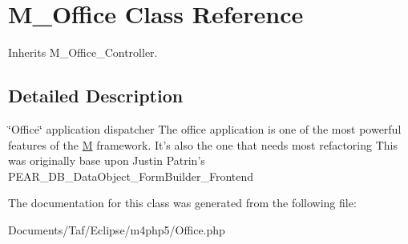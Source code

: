 \hypertarget{classM__Office}{
\section{M\_\-Office Class Reference}
\label{classM__Office}
}
Inherits M\_\-Office\_\-Controller.



\subsection{Detailed Description}
\char`\"{}Office\char`\"{} application dispatcher The office application is one of the most powerful features of the \hyperlink{namespaceM}{M} framework. It's also the one that needs most refactoring This was originally base upon Justin Patrin's PEAR\_\-DB\_\-DataObject\_\-FormBuilder\_\-Frontend 

The documentation for this class was generated from the following file:\begin{CompactItemize}
\item 
Documents/Taf/Eclipse/m4php5/Office.php\end{CompactItemize}
